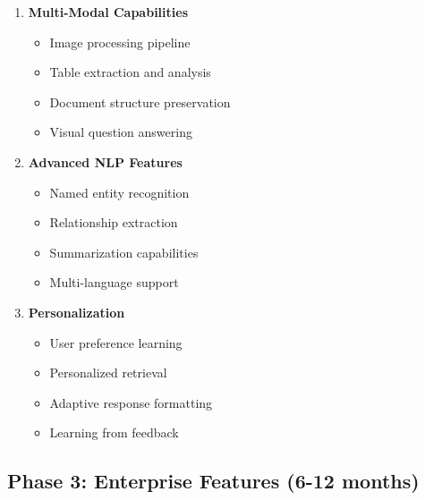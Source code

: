 \documentclass[12pt,a4paper]{article}
\begin{document}
\begin{enumerate}
    \item \textbf{Multi-Modal Capabilities}
    \begin{itemize}
        \item Image processing pipeline
        \item Table extraction and analysis
        \item Document structure preservation
        \item Visual question answering
    \end{itemize}
    
    \item \textbf{Advanced NLP Features}
    \begin{itemize}
        \item Named entity recognition
        \item Relationship extraction
        \item Summarization capabilities
        \item Multi-language support
    \end{itemize}
    
    \item \textbf{Personalization}
    \begin{itemize}
        \item User preference learning
        \item Personalized retrieval
        \item Adaptive response formatting
        \item Learning from feedback
    \end{itemize}
\end{enumerate}

\subsection{Phase 3: Enterprise Features (6-12 months)}
\end{document}
